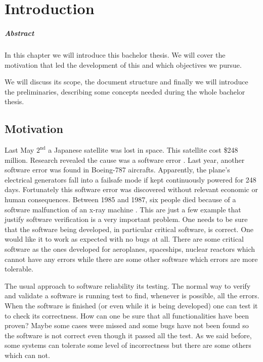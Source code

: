 \chapter{Introduction\label{chap:introduction}}

\paragraph{Abstract}

In this chapter we will introduce this bachelor thesis.
%
We will cover the motivation that led the development of this \thisworkm and which objectives we pursue.

We will discuss its scope, the document structure and finally we will introduce the preliminaries, describing some concepts needed during the whole bachelor thesis. 

\section{Motivation}

\label{Motivation}
Last May $\text{2}^{\text{nd}}$ a Japanese satellite was lost in space. This satellite cost \$248 million.
%
Research revealed the cause was a software error \cite{japaneseSatellite}. 
%
Last year, another software error was found in Boeing-787 aircrafts.
%
Apparently, the plane’s electrical generators fall into a failsafe mode if kept continuously powered 
for 248 days. \cite{boeing}
%
Fortunately this software error was discovered without relevant economic or human consequences.
%
Between 1985 and 1987, six people died because of a software malfunction of an x-ray machine \cite{xraykill}.
%
This are just a few example that justify software verification is a very important problem.
%
One needs to be sure that the software being developed, in particular critical software, is correct.
%
One would like it to work as expected with no bugs at all.
%
There are some critical software as the ones developed for aeroplanes, spaceships, nuclear reactors which cannot have any errors while there are some other software which errors are more tolerable.


The usual approach to software reliability its testing.
% 
The normal way to verify and validate a software is running test to find, whenever is possible, all the errors.
% 
When the software is finished (or even while it is being developed) one can test it to check its correctness.
%
How can one be sure that all functionalities have been proven? Maybe some cases were missed and some bugs have not been found so the software is not correct even though it passed all the test.
%
As we said before, some systems can tolerate some level of incorrectness but there are some others which can not.


